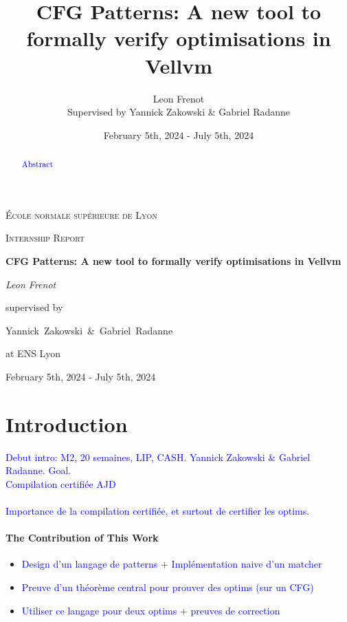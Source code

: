 \documentclass[11pt]{article}
\newcommand{\leon}[1]{\textcolor{blue}{#1}}
\begin{document}
\title{CFG Patterns: A new tool to formally verify optimisations in Vellvm}

\author{Leon Frenot\\ Supervised by Yannick Zakowski \& Gabriel Radanne}

\date{February 5th, 2024 - July 5th, 2024}

\begin{titlepage}
  \centering
  {\textsc{École normale supérieure de Lyon} \par}
  \vspace{1cm}
  {\Large \textsc{Internship Report}\par}
  \vspace{1.5cm}
  {\huge\bfseries CFG Patterns: A new tool to formally verify optimisations in Vellvm\par}
  \vspace{2cm}
  {\Large\itshape Leon Frenot\par}
  \vfill
  supervised by\par
  Yannick~Zakowski~\&~Gabriel~Radanne\par
  at ENS Lyon
  \vfill

  {\large February 5th, 2024 - July 5th, 2024\par}
\end{titlepage}


\tableofcontents
\newpage

\hypersetup{colorlinks=true, linkcolor=red}

\begin{abstract}
  \leon{Abstract}
\end{abstract}

\section{Introduction}
\label{sec:intro}

\indent
\leon{Debut intro: M2, 20 semaines, LIP, CASH. Yannick Zakowski \& Gabriel Radanne. Goal.}\\

\leon{Compilation certifiée AJD}

\paragraph{}
\leon{Importance de la compilation certifiée, et surtout de certifier les optims.}

\paragraph{The Contribution of This Work}
\begin{itemize}
    \item \leon{Design d'un langage de patterns + Implémentation naive d'un matcher}
    \item \leon{Preuve d'un théorème central pour prouver des optims (sur un CFG)}
    \item \leon{Utiliser ce langage pour deux optims + preuves de correction}
\end{itemize}
\end{document}
